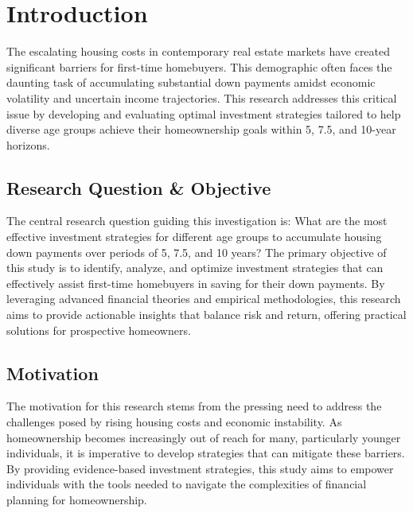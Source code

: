 \section{Introduction}
The escalating housing costs in contemporary real estate markets have created significant barriers for first-time homebuyers. This demographic often faces the daunting task of accumulating substantial down payments amidst economic volatility and uncertain income trajectories. This research addresses this critical issue by developing and evaluating optimal investment strategies tailored to help diverse age groups achieve their homeownership goals within 5, 7.5, and 10-year horizons.

\subsection{Research Question \& Objective}
The central research question guiding this investigation is: What are the most effective investment strategies for different age groups to accumulate housing down payments over periods of 5, 7.5, and 10 years? The primary objective of this study is to identify, analyze, and optimize investment strategies that can effectively assist first-time homebuyers in saving for their down payments. By leveraging advanced financial theories and empirical methodologies, this research aims to provide actionable insights that balance risk and return, offering practical solutions for prospective homeowners.

\subsection{Motivation}
The motivation for this research stems from the pressing need to address the challenges posed by rising housing costs and economic instability. As homeownership becomes increasingly out of reach for many, particularly younger individuals, it is imperative to develop strategies that can mitigate these barriers. By providing evidence-based investment strategies, this study aims to empower individuals with the tools needed to navigate the complexities of financial planning for homeownership.

\newpage
